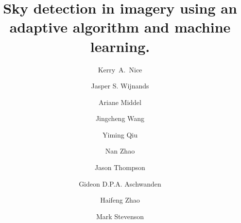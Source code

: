 \documentclass[final,3p,times,authoryear]{elsarticle}
\begin{document}
% 


\begin{frontmatter}



\title{Sky detection in imagery using an adaptive algorithm and machine learning.}




\author[melb]{Kerry~A.~Nice}
\author[melb]{Jasper S. Wijnands}
\author[asu]{Ariane Middel}
\author[cis]{Jingcheng Wang}
\author[cis]{Yiming Qiu}
\author[cis]{Nan Zhao}
\author[melb,sunshine]{Jason Thompson}
\author[melb]{Gideon D.P.A. Aschwanden}
\author[melb]{Haifeng Zhao}
\author[melb,eng]{Mark Stevenson}

\address[melb]{Transport, Health, and Urban Design Hub, Faculty of Architecture, Building, and Planning, University of Melbourne, Victoria 3010, Australia}
\address[cis]{School of Computing and Information Systems, University of Melbourne, Victoria 3010, Australia}
\address[eng]{Melbourne School of Engineering; and Melbourne School of Population and Global Health, University of Melbourne, Victoria, Australia.}
\address[sunshine]{Centre for Human Factors and Sociotechnical Systems, University of the Sunshine Coast, Australia.}
\address[asu]{School of Computing, Informatics, and Decision Systems Engineering (CIDSE), Arizona State University}






\end{frontmatter}
\end{document}
